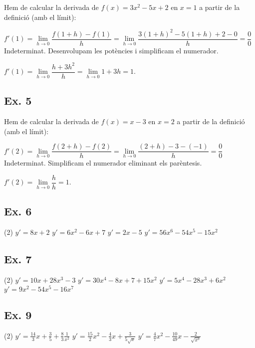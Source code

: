 \documentclass[a4paper, 11pt]{book}
\newcommand{\limx}[2][x]{\mathop{lim}\limits_{#1\to #2} }
\begin{document}
	Hem de calcular la derivada de $f(x)=3x^2-5x+2$ en $x=1$ a partir de la definició (amb el límit):
	
	$f'(1) = \limx[h]{0} \dfrac{f(1+h)-f(1)}{h}=\limx[h]{0} \dfrac{3(1+h)^2-5(1+h)+2 -0}{h}=\dfrac{0}{0}$ Indeterminat. Desenvolupam les potències i simplificam el numerador.
	
	$f'(1) = \limx[h]{0} \dfrac{h+3h^2}{h}=\limx[h]{0} 1+3h = 1$.
	
	
	\subsection*{Ex. 5}
	
	Hem de calcular la derivada de $f(x)=x-3$ en $x=2$ a partir de la definició (amb el límit):
	
	$f'(2) = \limx[h]{0} \dfrac{f(2+h)-f(2)}{h}=\limx[h]{0} \dfrac{(2+h)-3-(-1)}{h}=\dfrac{0}{0}$ Indeterminat. Simplificam el numerador eliminant els parèntesis.
	
	$f'(2) = \limx[h]{0} \dfrac{h}{h}=1$.
	
\subsection*{Ex. 6}

\begin{tasks}(2)
	\task $y'=8x+2$
	\task $y'=6x^2-6x+7$
	\task $y'=2x-5$
	\task $y'=56x^6-54x^5-15x^2$
\end{tasks}	

\subsection*{Ex. 7}

\begin{tasks}(2)
	\task $y'=10x+28x^3-3$
	\task $y'=30x^4-8x+7+15x^2$
	\task $y'=5x^4-28x^3+6x^2$
	\task $y'=9x^2-54x^5-16x^7$
\end{tasks}	


\subsection*{Ex. 9}

\begin{tasks}(2)
	\task $y'=\frac{14}{3}x+\frac{3}{5}+ \frac{8}{3}\frac{1}{x^2}$
	\task $y'=\frac{15}{2}x^2 - \frac{4}{3}x + \frac{3}{5\sqrt{x}}$
	\task $y'=\frac{4}{7}x^2 - \frac{10}{49}x-\frac{2}{\sqrt{x^3}}$
\end{tasks}	
\end{document}
